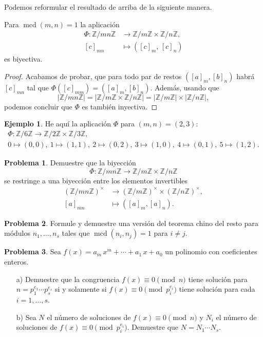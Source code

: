 \documentclass{article}
\newcommand{\ZZ}{\mathbb{Z}}
\DeclareMathOperator{\mcd}{mcd}
\theoremstyle{definition}
\newtheorem{problema}{Problema}[section]
\newtheorem*{ejemplo}{Ejemplo}
\begin{document}
Podemos reformular el resultado de arriba de la siguiente manera.

\begin{framed}
  Para $\mcd (m,n) = 1$ la aplicación
  \begin{align*}
    \Phi\colon \ZZ/mn\ZZ & \to \ZZ/m\ZZ \times \ZZ/n\ZZ,\\
    [c]_{mn} & \mapsto ([c]_m, \, [c]_n)
  \end{align*}
  es biyectiva.
\end{framed}

\begin{proof}
  Acabamos de probar, que para todo par de restos
  $([a]_m, [b]_n)$ habrá $[c]_{mn}$ tal que $\Phi ([c]_{mm}) = ([a]_m,[b]_n)$.
  Además, usando que
  $$|\ZZ/mn\ZZ| = |\ZZ/m\ZZ \times \ZZ/n\ZZ| = |\ZZ/m\ZZ| \times |\ZZ/n\ZZ|,$$
  podemos concluir que $\Phi$ es también inyectiva.
\end{proof}

\begin{ejemplo}
  He aquí la aplicación $\Phi$ para $(m,n) = (2,3)$:
  \begin{gather*}
    \Phi\colon \ZZ/6\ZZ \to \ZZ/2\ZZ \times \ZZ/3\ZZ,\\
    0 \mapsto (0,0), ~
    1 \mapsto (1,1), ~
    2 \mapsto (0,2), ~
    3 \mapsto (1,0), ~
    4 \mapsto (0,1), ~
    5 \mapsto (1,2).
  \end{gather*}
\end{ejemplo}

\begin{problema}
  \label{probl:crt-invertibles}
  Demuestre que la biyección
  $$\Phi\colon \ZZ/mn\ZZ \to \ZZ/m\ZZ \times \ZZ/n\ZZ$$
  se restringe a una biyección entre los elementos invertibles
  \begin{align*}
    (\ZZ/mn\ZZ)^\times & \to (\ZZ/m\ZZ)^\times \times (\ZZ/n\ZZ)^\times, \\
    [a]_{mn} & \mapsto ([a]_m, [a]_n).
  \end{align*}
\end{problema}

\begin{problema}
  Formule y demuestre una versión del teorema chino del resto para módulos
  $n_1, \ldots, n_s$ tales que $\mcd (n_i,n_j) = 1$ para $i \ne j$.
\end{problema}

\begin{problema}
  Sea $f (x) = a_m\,x^m + \cdots + a_1\,x + a_0$ un polinomio con coeficientes
  enteros.

  \begin{enumerate}
  \item[a)] Demuestre que la congruencia $f (x) \equiv 0 \pmod{n}$ tiene
    solución para $n = p_1^{e_1} \cdots p_s^{e_s}$ si y solamente si
    $f (x) \equiv 0 \pmod{p_i^{e_i}}$ tiene solución para cada $i = 1,\ldots,s$.

  \item[b)] Sea $N$ el número de soluciones de $f (x) \equiv 0 \pmod{n}$ y $N_i$
    el número de soluciones de $f (x) \equiv 0 \pmod{p_i^{e_i}}$. Demuestre que
    $N = N_1 \cdots N_s$.
  \end{enumerate}
\end{problema}
\end{document}
